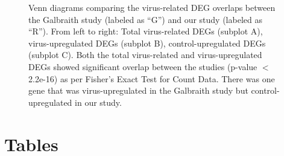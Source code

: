 \documentclass{bmcart}
\begin{document}
\begin{linenumbers}
\begin{backmatter}
\begin{figure}[h!]
\caption{
Venn diagrams comparing the virus-related DEG overlaps between the Galbraith study (labeled as ``G'') and our study (labeled as ``R''). From left to right: Total virus-related DEGs (subplot A), virus-upregulated DEGs (subplot B), control-upregulated DEGs (subplot C). Both the total virus-related and virus-upregulated DEGs showed significant overlap between the studies (p-value $<$ 2.2e-16) as per Fisher's Exact Test for Count Data. There was one gene that was virus-upregulated in the Galbraith study but control-upregulated in our study.}
\end{figure}

\newpage
\section*{Tables}


\end{backmatter}
\end{linenumbers}
\end{document}
